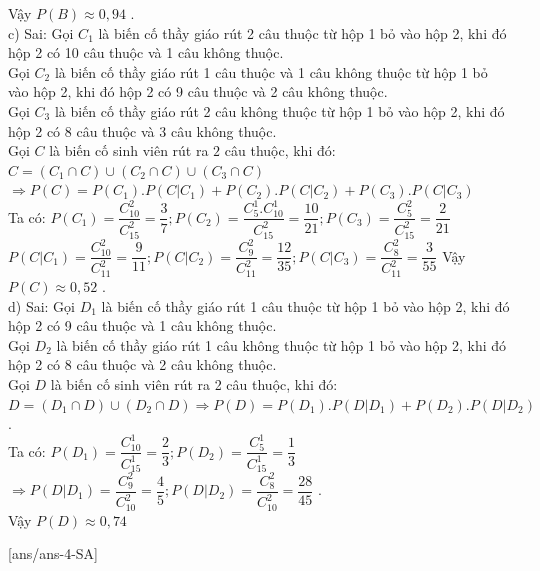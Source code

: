 \begin{ex}
{Vậy $P(B)\approx 0,94$ .\\
c) Sai: Gọi $C_1$ là biến cố thầy giáo rút 2 câu thuộc từ hộp 1 bỏ vào hộp 2, khi đó hộp 2 có 10 câu thuộc và 1 câu không thuộc.\\
Gọi $C_2$ là biến cố thầy giáo rút 1 câu thuộc và 1 câu không thuộc từ hộp 1 bỏ vào hộp 2, khi đó hộp 2 có 9 câu thuộc và 2 câu không thuộc.\\
Gọi $C_3$ là biến cố thầy giáo rút 2 câu không thuộc từ hộp 1 bỏ vào hộp 2, khi đó hộp 2 có 8 câu thuộc và 3 câu không thuộc.\\
Gọi $C$ là biến cố sinh viên rút ra $2$ câu thuộc, khi đó: $C=\left(C_1\cap C\right)\cup\left(C_2\cap C\right)\cup\left(C_3\cap C\right)$\\
$\Rightarrow P(C)=P\left(C_1\right).P\left(C|C_1\right)+P\left(C_2\right).P\left(C|C_2\right)+P\left(C_3\right).P\left(C|C_3\right)$\\
Ta có: $P\left(C_1\right)=\dfrac{C_{10}^2}{C_{15}^2}=\dfrac{3}{7};P\left(C_2\right)=\dfrac{C_5^1.C_{10}^1}{C_{15}^2}=\dfrac{10}{21};P\left(C_3\right)=\dfrac{C_5^2}{C_{15}^2}=\dfrac{2}{21}$\\
$P\left(C|C_1\right)=\dfrac{C_{10}^2}{C_{11}^2}=\dfrac{9}{11};P\left(C|C_2\right)=\dfrac{C_9^2}{C_{11}^2}=\dfrac{12}{35};P\left(C|C_3\right)=\dfrac{C_8^2}{C_{11}^2}=\dfrac{3}{55}$
Vậy $P(C)\approx 0,52$ .\\
d) Sai: Gọi $D_1$ là biến cố thầy giáo rút 1 câu thuộc từ hộp 1 bỏ vào hộp 2, khi đó hộp 2 có 9 câu thuộc và 1 câu không thuộc.\\
Gọi $D_2$ là biến cố thầy giáo rút 1 câu không thuộc từ hộp 1 bỏ vào hộp 2, khi đó hộp 2 có 8 câu thuộc và 2 câu không thuộc.\\
Gọi $D$ là biến cố sinh viên rút ra 2 câu thuộc, khi đó:\\
$D=\left(D_1\cap D\right)\cup\left(D_2\cap D\right)\Rightarrow P(D)=P\left(D_1\right).P\left(D|D_1\right)+P\left(D_2\right).P\left(D|D_2\right)$ .\\
Ta có: $P\left(D_1\right)=\dfrac{C_{10}^1}{C_{15}^1}=\dfrac{2}{3};P\left(D_2\right)=\dfrac{C_5^1}{C_{15}^1}=\dfrac{1}{3}$ $\Rightarrow P\left(D|D_1\right)=\dfrac{C_9^2}{C_{10}^2}=\dfrac{4}{5};P\left(D|D_2\right)=\dfrac{C_8^2}{C_{10}^2}=\dfrac{28}{45}$ .\\
Vậy $P(D)\approx 0,74$ }
\end{ex}
\TNSA
{}[ans/ans-4-SA]
